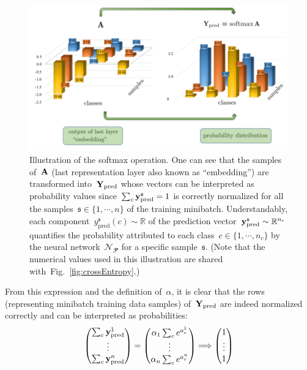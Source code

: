 \documentclass{article}
\begin{document}
\begin{figure}
\centering
\includegraphics[width=0.9\linewidth]{pptx/crossEntropy/Slide2.png}
\caption{Illustration of the softmax operation.  One can see that the samples of~${\bf A}$ (last representation layer also known as ``embedding'') are transformed into~${\bf Y}_\text{pred}$ whose vectors can be interpreted as probability values since~$\sum_c {\bf y}_\text{pred}^\mathfrak{s} = 1$ is correctly normalized for all the samples~$\mathfrak{s} \in \{ 1 , \cdots , n \}$ of the training minibatch. Understandably, each component~$y^\mathfrak{s}_\text{pred}(c) \sim \mathbb{R}$ of the prediction vector~${\bf y}^\mathfrak{s}_\text{pred} \sim \mathbb{R}^{n_c}$ quantifies the probability attributed to each class~$c \in \{ 1, \cdots , n_c \}$ by the neural network~$\mathcal{N}_\mathbfcal{P}$ for a specific sample~$\mathfrak{s}$.  (Note that the numerical values used in this illustration are shared with~Fig.~\ref{fig:crossEntropy}.)}
\label{fig:softMax}
\end{figure}

\noindent From this expression and the definition of~$\alpha$, it is clear that the rows (representing minibatch training data samples) of~${\bf Y}_\text{pred}$ are indeed normalized correctly and can be interpreted as probabilities:
\begin{equation*}
\left(
\begin{matrix}
\sum_c {\bf y}_\text{pred}^1 \\
\vdots \\
\sum_c {\bf y}_\text{pred}^n
\end{matrix}
\right) = \left(
\begin{matrix}
\alpha_1 \sum_c e^{a^1_c} \\
\vdots \\
\alpha_n \sum_c e^{a^n_c}
\end{matrix}
\right) \Longrightarrow \left(
\begin{matrix}
1 \\
\vdots \\
1
\end{matrix}
\right)
\end{equation*}
\end{document}
